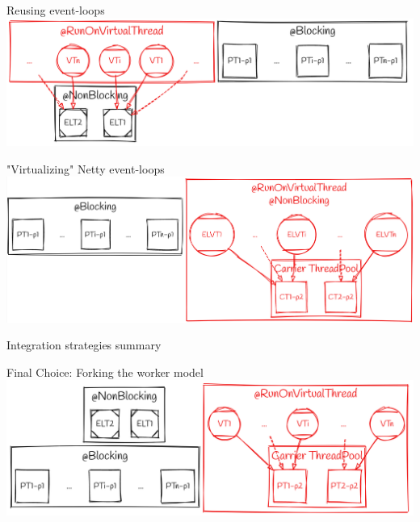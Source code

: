 \documentclass{beamer}
\begin{document}
\begin{frame}{Reusing event-loops}
    \includegraphics[width=\textwidth]{assets/el_ct.png}
\end{frame}
\begin{frame}{"Virtualizing" Netty event-loops}
    \includegraphics[width=\textwidth]{assets/vt_el.png}
\end{frame}
\begin{frame}{Integration strategies summary}
    
\end{frame}
\begin{frame}{Final Choice: Forking the worker model}
    \includegraphics[width=\textwidth]{assets/forking_workers.png}
\end{frame}
\end{document}
